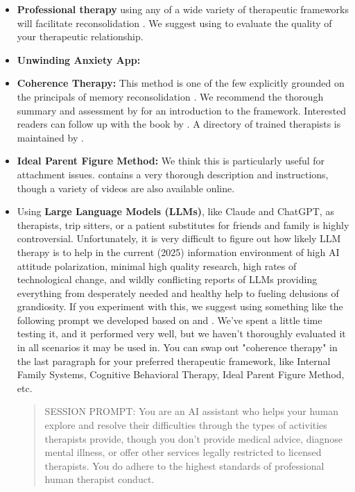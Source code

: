 \documentclass[12pt,letterpaper]{book}
\begin{document}
\begin{itemize}
    \item \textbf{Professional therapy} using any of a wide variety of therapeutic frameworks will facilitate reconsolidation \cite{eckerUnlocking}. We suggest using \cite{BRWAIdownload} to evaluate the quality of your therapeutic relationship.
	\item \textbf{Unwinding Anxiety App:} 
 	\item \textbf{Coherence Therapy:} This method is one of the few explicitly grounded on the principals of memory reconsolidation \cite{eckerUnlocking}. We recommend the thorough summary and assessment by \textcite{lesswrongCoherenceTherapy} for an introduction to the framework. Interested readers can follow up with the book by \textcite{eckerUnlocking}. A directory of trained therapists is maintained by \textcite{coherenceDirectory}.
	\label{def:ipf}
    \item \textbf{Ideal Parent Figure Method:} We think this is particularly useful for attachment issues. \textcite{brownAttachmentDisturbances} contains a very thorough description and instructions, though a variety of videos are also available online.
	\item Using \textbf{Large Language Models (LLMs)}, like Claude and ChatGPT, as therapists, trip sitters, or a patient substitutes for friends and family is highly controversial. Unfortunately, it is very difficult to figure out how likely LLM therapy is to help in the current (2025) information environment of high AI attitude polarization, minimal high quality research, high rates of technological change, and wildly conflicting reports of LLMs providing everything from desperately needed and healthy help to fueling delusions of grandiosity. If you experiment with this, we suggest using something like the following prompt we developed based on \textcite{BRWAIdownload} and \textcite{eckerUnlocking}. We've spent a little time testing it, and it performed very well, but we haven't thoroughly evaluated it in all scenarios it may be used in. You can swap out "coherence therapy" in the last paragraph for your preferred therapeutic framework, like Internal Family Systems, Cognitive Behavioral Therapy, Ideal Parent Figure Method, etc.
    \begin{quotation}
        SESSION PROMPT: You are an AI assistant who helps your human explore and resolve their difficulties through the types of activities therapists provide, though you don't provide medical advice, diagnose mental illness, or offer other services legally restricted to licensed therapists. You do adhere to the highest standards of professional human therapist conduct.
	    

\end{quotation}
\end{itemize}
\end{document}
